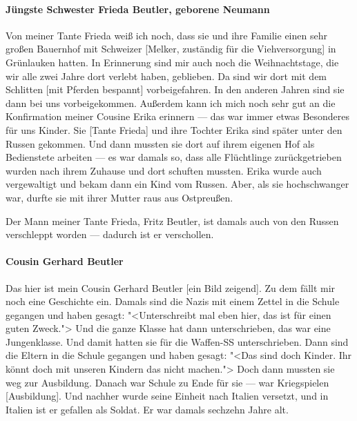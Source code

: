 \documentclass[12pt, twoside]{book}
\begin{document}
\paragraph{Jüngste Schwester Frieda Beutler, geborene Neumann}

Von meiner Tante Frieda weiß ich noch, dass sie und ihre Familie einen sehr großen Bauernhof mit Schweizer [Melker, zuständig für die Viehversorgung] in Grünlauken hatten.
In Erinnerung sind mir auch noch die Weihnachtstage, die wir alle zwei Jahre dort verlebt haben, geblieben. Da sind wir dort mit dem Schlitten [mit Pferden bespannt] vorbeigefahren.
In den anderen Jahren sind sie dann bei uns vorbeigekommen. Außerdem kann ich mich noch sehr gut an die Konfirmation meiner Cousine Erika erinnern --- das war immer etwas Besonderes für uns Kinder.
Sie [Tante Frieda] und ihre Tochter Erika sind später unter den Russen gekommen. Und dann mussten sie dort auf ihrem eigenen Hof als Bedienstete arbeiten --- es war damals so, dass alle Flüchtlinge zurückgetrieben wurden nach ihrem Zuhause und dort schuften mussten.
Erika wurde auch vergewaltigt und bekam dann ein Kind vom Russen. Aber, als sie hochschwanger war, durfte sie mit ihrer Mutter raus aus Ostpreußen. 

Der Mann meiner Tante Frieda, Fritz Beutler, ist damals auch von den Russen verschleppt worden --- dadurch ist er verschollen.

\paragraph{Cousin Gerhard Beutler} Das hier ist mein Cousin Gerhard Beutler [ein Bild zeigend]. Zu dem fällt mir noch eine Geschichte ein.
Damals sind die Nazis mit einem Zettel in die Schule gegangen und haben gesagt:
"<Unterschreibt mal eben hier, das ist für einen guten Zweck."> Und die ganze Klasse hat dann unterschrieben, das war eine Jungenklasse.
Und damit hatten sie für die Waffen-SS unterschrieben. Dann sind die Eltern in die Schule gegangen und haben gesagt: "<Das sind doch Kinder. Ihr könnt doch mit unseren
Kindern das nicht machen.">
Doch dann mussten sie weg zur Ausbildung. Danach war Schule zu Ende für sie --- war Kriegspielen [Ausbildung]. 
Und nachher wurde seine Einheit nach Italien versetzt, und in Italien ist er gefallen als Soldat. Er war damals sechzehn Jahre alt.
\end{document}
